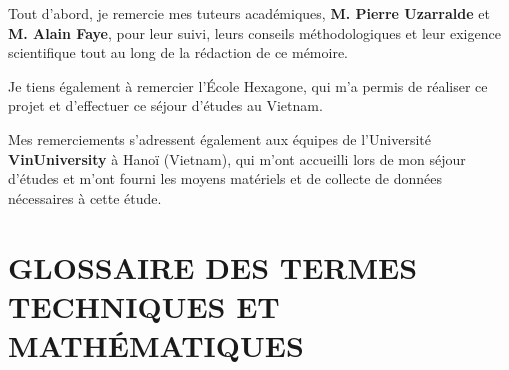 \documentclass[10pt, a4paper]{article}
\begin{document}
Tout d'abord, je remercie mes tuteurs académiques, \textbf{M. Pierre
Uzarralde} et \textbf{M. Alain Faye}, pour leur suivi, leurs conseils
méthodologiques et leur exigence scientifique tout au long de la
rédaction de ce mémoire.

Je tiens également à remercier l'École Hexagone, qui m'a permis de
réaliser ce projet et d'effectuer ce séjour d'études au Vietnam.

Mes remerciements s'adressent également aux équipes de l'Université
\textbf{VinUniversity} à Hanoï (Vietnam), qui m'ont accueilli lors de
mon séjour d'études et m'ont fourni les moyens matériels et de collecte
de données nécessaires à cette étude.

\newpage

\section{GLOSSAIRE DES TERMES TECHNIQUES ET
MATHÉMATIQUES}\label{glossaire-des-termes-techniques-et-mathuxe9matiques}
\end{document}
